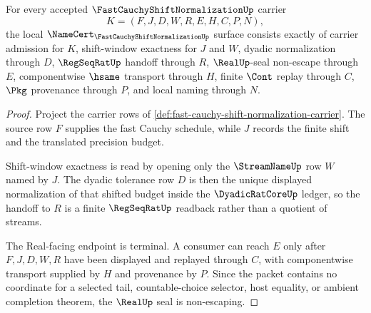 \begin{theorem}
\label{thm:fast-cauchy-shift-normalization-namecert-obligations}
For every accepted $\FastCauchyShiftNormalizationUp$ carrier
$$
K=(F,J,D,W,R,E,H,C,P,N),
$$
the local $\NameCert_{\FastCauchyShiftNormalizationUp}$ surface consists exactly of carrier admission for $K$, shift-window exactness for $J$ and $W$, dyadic normalization through $D$, $\RegSeqRatUp$ handoff through $R$, $\RealUp$-seal non-escape through $E$, componentwise $\hsame$ transport through $H$, finite $\Cont$ replay through $C$, $\Pkg$ provenance through $P$, and local naming through $N$.
\end{theorem}
\begin{proof}
Project the carrier rows of \autoref{def:fast-cauchy-shift-normalization-carrier}. The source row $F$ supplies the fast Cauchy schedule, while $J$ records the finite shift and the translated precision budget.

Shift-window exactness is read by opening only the $\StreamNameUp$ row $W$ named by $J$. The dyadic tolerance row $D$ is then the unique displayed normalization of that shifted budget inside the $\DyadicRatCoreUp$ ledger, so the handoff to $R$ is a finite $\RegSeqRatUp$ readback rather than a quotient of streams.

The Real-facing endpoint is terminal. A consumer can reach $E$ only after $F,J,D,W,R$ have been displayed and replayed through $C$, with componentwise transport supplied by $H$ and provenance by $P$. Since the packet contains no coordinate for a selected tail, countable-choice selector, host equality, or ambient completion theorem, the $\RealUp$ seal is non-escaping.
\end{proof}





